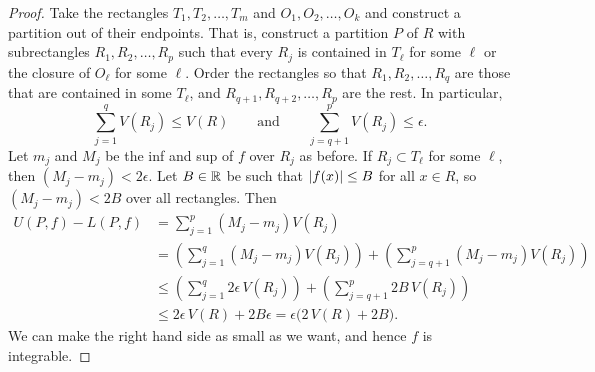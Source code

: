 \begin{proof}
Take the rectangles $T_1,T_2,\ldots,T_m$ and $O_1,O_2,\ldots,O_k$
and construct a partition out of their endpoints.  That is, construct
a partition $P$ of $R$ with subrectangles $R_1,R_2,\ldots,R_p$
such that every $R_j$ is contained in $T_\ell$ for some $\ell$
or the closure of $O_\ell$ for some $\ell$.  Order
the rectangles so that $R_1,R_2,\ldots,R_q$ are those
that are contained in some $T_\ell$, and $R_{q+1},R_{q+2},\ldots,R_{p}$
are the rest.
In particular,
\begin{equation*}
\sum_{j=1}^q V(R_j) \leq V(R)
\qquad \text{and} \qquad
\sum_{j=q+1}^p V(R_j) \leq \epsilon .
\end{equation*}
Let $m_j$ and $M_j$ be the inf and sup
of $f$
over $R_j$ as before.
If $R_j \subset T_\ell$ for some $\ell$, then $(M_j-m_j) < 2 \epsilon$.
Let $B \in {\mathbb{R}}$ be such that
$\lvert {f(x)} \rvert \leq B$ for all $x \in R$, so $(M_j-m_j) < 2B$ over all
rectangles. Then
\begin{equation*}
\begin{split}
U(P,f)-L(P,f)
& =
\sum_{j=1}^p (M_j-m_j) V(R_j)
\\
& =
\left(
\sum_{j=1}^q (M_j-m_j) V(R_j)
\right)
+
\left(
\sum_{j=q+1}^p (M_j-m_j) V(R_j)
\right)
\\
& \leq
\left(
\sum_{j=1}^q 2\epsilon\, V(R_j)
\right)
+
\left(
\sum_{j=q+1}^p 2 B\, V(R_j)
\right)
\\
& \leq
2 \epsilon\, V(R)
+
2B \epsilon = \epsilon \bigl(2\, V(R)+2B\bigr) .
\end{split}
\end{equation*}
We can make the right hand side as small as we want,
and hence $f$ is integrable.

\medskip


\end{proof}
